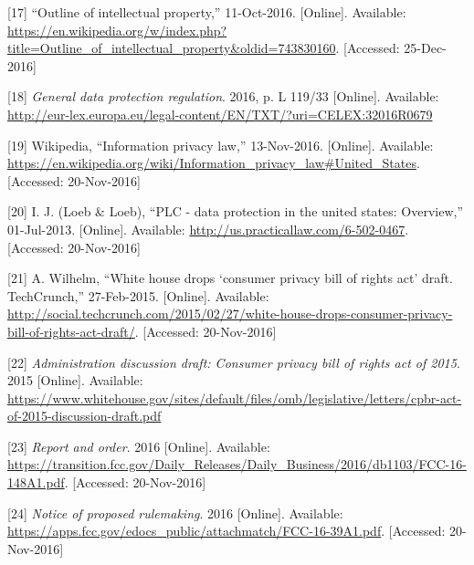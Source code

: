 \documentclass[12pt,english,a4paper,titlepage,cleardoublepage=empty,dottedtoc]{report}
\begin{document}
\hypertarget{ref-web_2016_wikipedia_intellectual-property}{}
{[}17{]} ``Outline of intellectual property,'' 11-Oct-2016.
{[}Online{]}. Available:
\url{https://en.wikipedia.org/w/index.php?title=Outline_of_intellectual_property\&oldid=743830160}.
{[}Accessed: 25-Dec-2016{]}

\hypertarget{ref-regulation_2016_eu_general-data-protection-regulation_definition}{}
{[}18{]} \emph{General data protection regulation}. 2016, p. L 119/33
{[}Online{]}. Available:
\url{http://eur-lex.europa.eu/legal-content/EN/TXT/?uri=CELEX:32016R0679}

\hypertarget{ref-web_2016_wikipedia_information-privacy-law_us}{}
{[}19{]} Wikipedia, ``Information privacy law,'' 13-Nov-2016.
{[}Online{]}. Available:
\url{https://en.wikipedia.org/wiki/Information_privacy_law\#United_States}.
{[}Accessed: 20-Nov-2016{]}

\hypertarget{ref-web_2016_data-protection-laws-in-the-us}{}
{[}20{]} I. J. (Loeb \& Loeb), ``PLC - data protection in the united
states: Overview,'' 01-Jul-2013. {[}Online{]}. Available:
\url{http://us.practicallaw.com/6-502-0467}. {[}Accessed: 20-Nov-2016{]}

\hypertarget{ref-web_2015_white-house-releases-consumer-privacy-bill-draft}{}
{[}21{]} A. Wilhelm, ``White house drops `consumer privacy bill of
rights act' draft. TechCrunch,'' 27-Feb-2015. {[}Online{]}. Available:
\url{http://social.techcrunch.com/2015/02/27/white-house-drops-consumer-privacy-bill-of-rights-act-draft/}.
{[}Accessed: 20-Nov-2016{]}

\hypertarget{ref-bill-draft_2015_us_consumer-privacy-bill-of-rights-act_definition}{}
{[}22{]} \emph{Administration discussion draft: Consumer privacy bill of
rights act of 2015}. 2015 {[}Online{]}. Available:
\url{https://www.whitehouse.gov/sites/default/files/omb/legislative/letters/cpbr-act-of-2015-discussion-draft.pdf}

\hypertarget{ref-rules_2016_fcc_to-protect-broadband-consumer-privacy_sensitive-types-of-data}{}
{[}23{]} \emph{Report and order}. 2016 {[}Online{]}. Available:
\url{https://transition.fcc.gov/Daily_Releases/Daily_Business/2016/db1103/FCC-16-148A1.pdf}.
{[}Accessed: 20-Nov-2016{]}

\hypertarget{ref-rules_2016_fcc_to-protect-broadband-consumer-privacy_personally-identifiable-information}{}
{[}24{]} \emph{Notice of proposed rulemaking}. 2016 {[}Online{]}.
Available:
\url{https://apps.fcc.gov/edocs_public/attachmatch/FCC-16-39A1.pdf}.
{[}Accessed: 20-Nov-2016{]}
\end{document}
